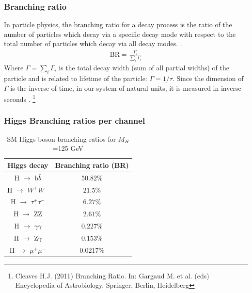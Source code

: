 \documentclass[11pt]{beamer}
\begin{document}
\begin{frame}
\frametitle{Branching ratio}
\small{In particle physics, the branching ratio for a decay process is the ratio of the number of particles which decay via a specific decay mode with respect to the total number of particles which decay via all decay modes. \footnotemark.}
\begin{align}
\text{BR} =\frac{\Gamma_i}{\sum_{i}\Gamma_i}
\end{align}
\small{Where $\Gamma=\sum_i\Gamma_i$ is the total decay width (sum of all partial widths) of the particle and is related to lifetime of the particle: $\Gamma=1/\tau$.
Since the dimension of $\Gamma$ is the inverse of time, in our system of natural units, it is measured in inverse seconds} .%
\footnote[0]{\tiny{Cleaves H.J. (2011) Branching Ratio. In: Gargaud M. et al. (eds) Encyclopedia of Astrobiology. Springer, Berlin, Heidelberg} }
\end{frame}
 


\begin{frame}
\frametitle{Higgs Branching ratios per channel}
\begin{table}
	\caption*{SM Higgs boson branching ratios for  $M_H$ =125 GeV}
\begin{center}
\begin{tabular}{|c|c|}
	\hline
	Higgs decay & Branching ratio (BR)\\
	\hline
	H $\rightarrow$ b$\bar{b}$ &
	$50.82\%$ \\
	\hline
	H $\rightarrow$ $W^+W^-$ &
	$21.5\%$ \\
	\hline
	H $\rightarrow$ $\tau^+ \tau^-$ &
	$6.27\%$\\
\hline
	H $\rightarrow$ ZZ &
$2.61\%$\\
\hline
	H $\rightarrow$ $\gamma\gamma$ &
$0.227\%$\\
\hline
	H $\rightarrow$ Z$\gamma$ &
$0.153\%$\\
\hline
	H $\rightarrow$ $\mu^+\mu^-$ &
$0.0217\%$\\
\hline
\end{tabular}
\end{center}
\end{table}

\end{frame}
\end{document}
